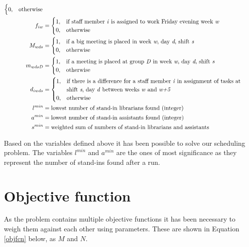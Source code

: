 \begin{align}
\begin{cases}
 		0, & \text{otherwise}
	\end{cases}
	\\
	f_{iw}&=
	\begin{cases}
 		1, & \text{if staff member \textit{i} is assigned to work Friday evening week \textit{w}} \\
 		0, & \text{otherwise}
	\end{cases}	
	\\
	M_{wds}&=
	\begin{cases}
	 	1, & \text{if a big meeting is placed in week \textit{w}, day \textit{d}, shift \textit{s}} \\
	 	0, & \text{otherwise}
	\end{cases}
	\\
	m_{wdsD}&=
	\begin{cases}
	 	1, & \text{if a meeting is placed at group \textit{D} in week \textit{w}, day \textit{d}, shift \textit{s}} \\
	 	0, & \text{otherwise}
	\end{cases}
	\\
	d_{iwds}&=
	\begin{cases}
	 	1, & \text{if there is a difference for a staff member \textit{i} in assignment of tasks at }\\
	 		& \text{shift \textit{s}, day \textit{d} between weeks \textit{w} and \textit{w+5}} \\
	 	0, & \text{otherwise}
	\end{cases}
	\\
	l^{min}&= \text{lowest number of stand-in librarians found (integer)} \\
	a^{min}&= \text{lowest number of stand-in assistants found (integer)} \\
	s^{min}&= \text{weighted sum of numbers of stand-in librarians and assistants}
\end{align}

Based on the variables defined above it has been possible to solve our scheduling problem. The variables \textit{$l^{min}$} and \textit{$a^{min}$} are the ones of most significance as they represent the number of stand-ins found after a run. 

\section{Objective function} \label{section:obj}
As the problem contains multiple objective functions it has been necessary to weigh them against each other using parameters. These are shown in Equation \ref{objfcn} below, as $M$ and $N$.

